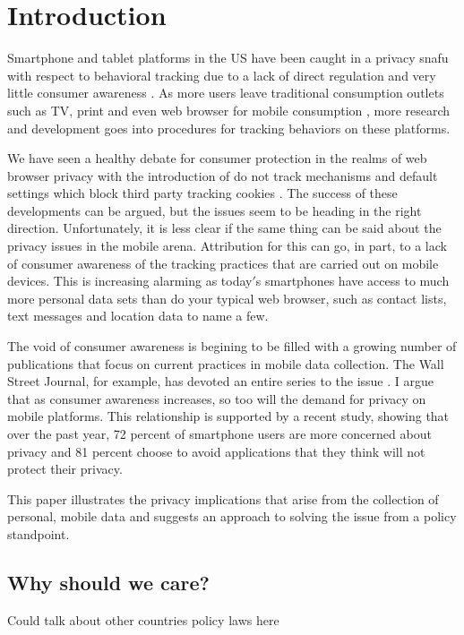 \section {Introduction}

Smartphone and tablet platforms in the US have been caught in a privacy snafu with respect to behavioral tracking due to a lack of direct regulation \cite{Priv2013} and very little consumer awareness \cite{Jenn2012}. As more users leave traditional consumption outlets such as TV, print and even web browser for mobile consumption \cite{Abi2012}, more research and development goes into procedures for tracking behaviors on these platforms.

We have seen a healthy debate for consumer protection in the realms of web browser privacy with the introduction of do not track mechanisms \cite{W3C2012} and default settings which block third party tracking cookies \cite{Moz2013}. The success of these developments can be argued, but the issues seem to be heading in the right direction. Unfortunately, it is less clear if the same thing can be said about the privacy issues in the mobile arena. 
Attribution for this can go, in part, to a lack of consumer awareness of the tracking practices that are carried out on mobile devices\cite{?}. 
This is increasing alarming as today$'$s smartphones have access to much more personal data sets than do your typical web browser, such as contact lists, text messages and location data to name a few. 


The void of consumer awareness is begining to be filled with a growing number of publications that focus on current practices in mobile data collection. The Wall Street Journal, for example, has devoted an entire series to the issue \cite{Wsj2013}. I argue that as consumer awareness increases, so too will the demand for privacy on mobile platforms. This relationship is supported by a recent study\cite{Trust2013}, showing that over the past year, 72 percent of smartphone users are more concerned about privacy and 81 percent choose to avoid applications that they think will not protect their privacy. 

This paper illustrates the privacy implications that arise from the collection of personal, mobile data and suggests an approach to solving the issue from a policy standpoint.  

\subsection{Why should we care?}

	Could talk about other countries policy laws here

  
